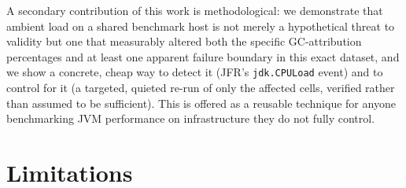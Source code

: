 \documentclass[11pt]{article}
\newcommand{\code}[1]{\texttt{#1}}
\begin{document}
A secondary contribution of this work is methodological: we demonstrate that ambient load on a
shared benchmark host is not merely a hypothetical threat to validity but one that measurably
altered both the specific GC-attribution percentages and at least one apparent failure boundary
in this exact dataset, and we show a concrete, cheap way to detect it (JFR's \code{jdk.CPULoad}
event) and to control for it (a targeted, quieted re-run of only the affected cells, verified
rather than assumed to be sufficient). This is offered as a reusable technique for anyone
benchmarking JVM performance on infrastructure they do not fully control.

\section{Limitations}
\label{sec:limitations}
\end{document}
